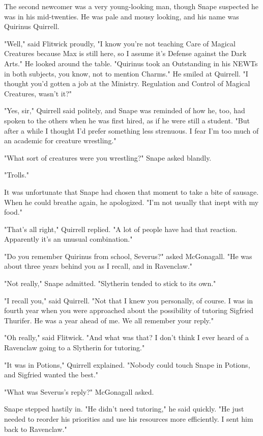 The second newcomer was a very young-looking man, though Snape suspected he was in his mid-twenties. He was pale and mousy looking, and his name was Quirinus Quirrell.

"Well," said Flitwick proudly, "I know you're not teaching Care of Magical Creatures because Max is still here, so I assume it's Defense against the Dark Arts." He looked around the table. "Quirinus took an Outstanding in his NEWTs in both subjects, you know, not to mention Charms." He smiled at Quirrell. "I thought you'd gotten a job at the Ministry. Regulation and Control of Magical Creatures, wasn't it?"

"Yes, sir," Quirrell said politely, and Snape was reminded of how he, too, had spoken to the others when he was first hired, as if he were still a student. "But after a while I thought I'd prefer something less strenuous. I fear I'm too much of an academic for creature wrestling."

"What sort of creatures were you wrestling?" Snape asked blandly.

"Trolls."

It was unfortunate that Snape had chosen that moment to take a bite of sausage. When he could breathe again, he apologized. "I'm not usually that inept with my food."

"That's all right," Quirrell replied. "A lot of people have had that reaction. Apparently it's an unusual combination."

"Do you remember Quirinus from school, Severus?" asked McGonagall. "He was about three years behind you as I recall, and in Ravenclaw."

"Not really," Snape admitted. "Slytherin tended to stick to its own."

"I recall you," said Quirrell. "Not that I knew you personally, of course. I was in fourth year when you were approached about the possibility of tutoring Sigfried Thurifer. He was a year ahead of me. We all remember your reply."

"Oh really," said Flitwick. "And what was that? I don't think I ever heard of a Ravenclaw going to a Slytherin for tutoring."

"It was in Potions," Quirrell explained. "Nobody could touch Snape in Potions, and Sigfried wanted the best."

"What was Severus's reply?" McGonagall asked.

Snape stepped hastily in. "He didn't need tutoring," he said quickly. "He just needed to reorder his priorities and use his resources more efficiently. I sent him back to Ravenclaw."

